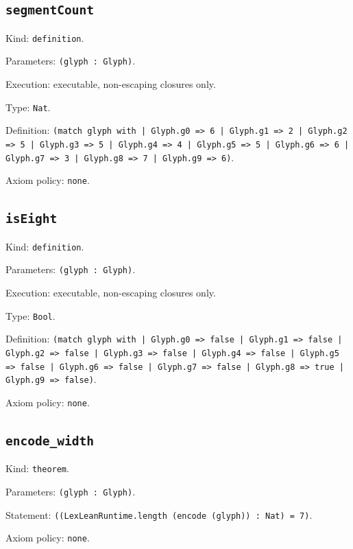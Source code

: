 \documentclass[11pt]{article}
\begin{document}
\subsection*{\texttt{segmentCount}}
\noindent Kind: \texttt{definition}.\par
\noindent Parameters: \texttt{(glyph : Glyph)}.\par
\noindent Execution: executable, non-escaping closures only.\par
\noindent Type: \texttt{Nat}.\par
\noindent Definition: \texttt{(match glyph with | Glyph.g0 => 6 | Glyph.g1 => 2 | Glyph.g2 => 5 | Glyph.g3 => 5 | Glyph.g4 => 4 | Glyph.g5 => 5 | Glyph.g6 => 6 | Glyph.g7 => 3 | Glyph.g8 => 7 | Glyph.g9 => 6)}.\par
\noindent Axiom policy: \texttt{none}.\par
\subsection*{\texttt{isEight}}
\noindent Kind: \texttt{definition}.\par
\noindent Parameters: \texttt{(glyph : Glyph)}.\par
\noindent Execution: executable, non-escaping closures only.\par
\noindent Type: \texttt{Bool}.\par
\noindent Definition: \texttt{(match glyph with | Glyph.g0 => false | Glyph.g1 => false | Glyph.g2 => false | Glyph.g3 => false | Glyph.g4 => false | Glyph.g5 => false | Glyph.g6 => false | Glyph.g7 => false | Glyph.g8 => true | Glyph.g9 => false)}.\par
\noindent Axiom policy: \texttt{none}.\par
\subsection*{\texttt{encode\_width}}
\noindent Kind: \texttt{theorem}.\par
\noindent Parameters: \texttt{(glyph : Glyph)}.\par
\noindent Statement: \texttt{((LexLeanRuntime.length (encode (glyph)) : Nat) = 7)}.\par
\noindent Axiom policy: \texttt{none}.\par
\end{document}

